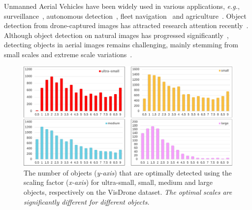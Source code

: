 \documentclass[letterpaper]{article} %
\def \eg {\emph{e.g.}}
\newcommand\rjf[1]{\textcolor{red}{\{RJF: #1\}}}
\newcommand\qz[1]{\textcolor{blue}{\{QZ: #1\}}}
\begin{document}
Unmanned Aerial Vehicles have been widely used in various applications, \eg, surveillance~\cite{Yun_2022_surveillance}, autonomous detection~\cite{REN_2017_UAVDetection, REN_2021_UAVDetection}, fleet navigation~\cite{Alami_2023_FleetNavigation} and agriculture~\cite{Tokekar_2016_agriculture}. %
Object detection from drone-captured images has attracted research attention recently~\cite{Xi_2021_SeanHE, Yue_2020_SeanHe, Bouguettaya_2022_review}. %
Although object detection on natural images has progressed significantly~\cite{Ge_2021_YOLOX}, detecting objects in aerial images remains challenging, mainly stemming from small scales and extreme scale variations~\cite{Deng_2021_GLSAN, Xu_2022_AdaZoom}.

\begin{figure}[t]
	\centering
	\centerline{\includegraphics[width= 1\columnwidth]{./images/Intro1.pdf}}
	\caption{%
 The number of objects (\textit{y-axis}) that are optimally detected using the scaling factor (\textit{x-axis}) for ultra-small, small, medium and large objects, respectively on the VisDrone dataset. \textit{The optimal scales are significantly different for different objects.}%
 }
	\label{fig: intro}
\end{figure}
\end{document}

